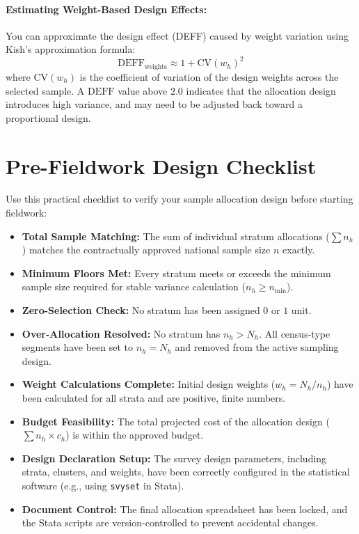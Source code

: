 \documentclass[11pt, a4paper]{article}
\begin{document}
\paragraph{Estimating Weight-Based Design Effects:}
You can approximate the design effect (DEFF) caused by weight variation using Kish's approximation formula:
\begin{equation}
    \text{DEFF}_{\text{weights}} \approx 1 + \text{CV}(w_h)^2
\end{equation}
where $\text{CV}(w_h)$ is the coefficient of variation of the design weights across the selected sample. A $\text{DEFF}$ value above $2.0$ indicates that the allocation design introduces high variance, and may need to be adjusted back toward a proportional design.

\newpage

\section{Pre-Fieldwork Design Checklist}

Use this practical checklist to verify your sample allocation design before starting fieldwork:

\begin{itemize}[label=$\square$]
    \item \textbf{Total Sample Matching:} The sum of individual stratum allocations ($\sum n_h$) matches the contractually approved national sample size $n$ exactly.
    \item \textbf{Minimum Floors Met:} Every stratum meets or exceeds the minimum sample size required for stable variance calculation ($n_h \ge n_{\text{min}}$).
    \item \textbf{Zero-Selection Check:} No stratum has been assigned $0$ or $1$ unit.
    \item \textbf{Over-Allocation Resolved:} No stratum has $n_h > N_h$. All census-type segments have been set to $n_h = N_h$ and removed from the active sampling design.
    \item \textbf{Weight Calculations Complete:} Initial design weights ($w_h = N_h / n_h$) have been calculated for all strata and are positive, finite numbers.
    \item \textbf{Budget Feasibility:} The total projected cost of the allocation design ($\sum n_h \times c_h$) is within the approved budget.
    \item \textbf{Design Declaration Setup:} The survey design parameters, including strata, clusters, and weights, have been correctly configured in the statistical software (e.g., using \texttt{svyset} in Stata).
    \item \textbf{Document Control:} The final allocation spreadsheet has been locked, and the Stata scripts are version-controlled to prevent accidental changes.
\end{itemize}
\end{document}
